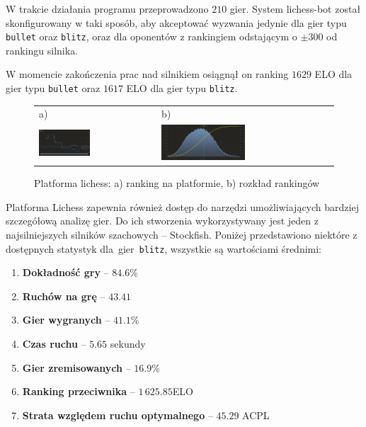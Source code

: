 
W trakcie działania programu przeprowadzono $210$ gier.
System lichess-bot został skonfigurowany w taki sposób, aby akceptować wyzwania jedynie dla gier typu \texttt{bullet} oraz \texttt{blitz}, oraz dla oponentów z rankingiem odstającym o $\pm300$ od rankingu silnika.

W momencie zakończenia prac nad silnikiem osiągnął on ranking $1629$ ELO dla gier typu \texttt{bullet} oraz $1617$ ELO dla gier typu \texttt{blitz}.

\begin{figure}[ht]
    \centering
    \begin{tabular}{@{}ll@{}}
        a) & b) \\
        \includegraphics[width=0.45\textwidth]{rozdzialy/rozdzial03/2_porownanie-z-innymi-silnikami/rysunki/lichess-ranking}
        &
        \includegraphics[width=0.5\textwidth]{rozdzialy/rozdzial03/2_porownanie-z-innymi-silnikami/rysunki/lichess-rozklad}
    \end{tabular}
    \caption{Platforma lichess: a) ranking na platformie, b) rozkład rankingów}
    \label{fig: rankig_lichess}

\end{figure}

Platforma Lichess zapewnia również dostęp do narzędzi umożliwiających bardziej szczegółową analizę gier.
Do ich stworzenia wykorzystywany jest jeden z najsilniejszych silników szachowych – Stockfish.
Poniżej przedstawiono niektóre z dostępnych statystyk dla~gier~\texttt{blitz}, wszystkie są wartościami średnimi:
\begin{enumerate}
    \item \textbf{Dokładność gry} – $84.6$\%
    \item \textbf{Ruchów na grę} – $43.41$
    \item \textbf{Gier wygranych} – $41.1$\%
    \item \textbf{Czas ruchu} – $5.65$ sekundy
    \item \textbf{Gier zremisowanych} – $16.9$\%
    \item \textbf{Ranking przeciwnika} – $1\,625.85$ELO
    \item \textbf{Strata względem ruchu optymalnego} – $45.29$ ACPL

\end{enumerate}

